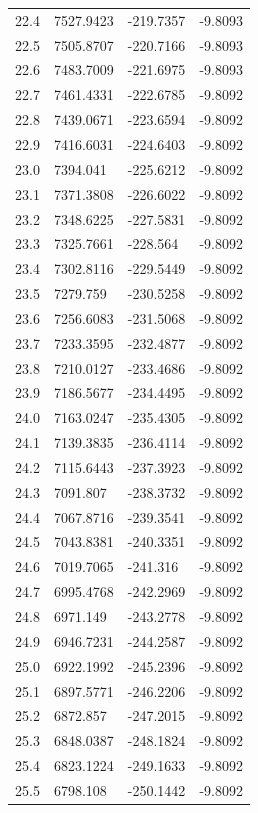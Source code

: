 \begin{table}[H]
\begin{tabular}{llll}
22.4 & 7527.9423 & -219.7357 & -9.8093 \\
22.5 & 7505.8707 & -220.7166 & -9.8093 \\
22.6 & 7483.7009 & -221.6975 & -9.8093 \\
22.7 & 7461.4331 & -222.6785 & -9.8092 \\
22.8 & 7439.0671 & -223.6594 & -9.8092 \\
22.9 & 7416.6031 & -224.6403 & -9.8092 \\
23.0 & 7394.041 & -225.6212 & -9.8092 \\
23.1 & 7371.3808 & -226.6022 & -9.8092 \\
23.2 & 7348.6225 & -227.5831 & -9.8092 \\
23.3 & 7325.7661 & -228.564 & -9.8092 \\
23.4 & 7302.8116 & -229.5449 & -9.8092 \\
23.5 & 7279.759 & -230.5258 & -9.8092 \\
23.6 & 7256.6083 & -231.5068 & -9.8092 \\
23.7 & 7233.3595 & -232.4877 & -9.8092 \\
23.8 & 7210.0127 & -233.4686 & -9.8092 \\
23.9 & 7186.5677 & -234.4495 & -9.8092 \\
24.0 & 7163.0247 & -235.4305 & -9.8092 \\
24.1 & 7139.3835 & -236.4114 & -9.8092 \\
24.2 & 7115.6443 & -237.3923 & -9.8092 \\
24.3 & 7091.807 & -238.3732 & -9.8092 \\
24.4 & 7067.8716 & -239.3541 & -9.8092 \\
24.5 & 7043.8381 & -240.3351 & -9.8092 \\
24.6 & 7019.7065 & -241.316 & -9.8092 \\
24.7 & 6995.4768 & -242.2969 & -9.8092 \\
24.8 & 6971.149 & -243.2778 & -9.8092 \\
24.9 & 6946.7231 & -244.2587 & -9.8092 \\
25.0 & 6922.1992 & -245.2396 & -9.8092 \\
25.1 & 6897.5771 & -246.2206 & -9.8092 \\
25.2 & 6872.857 & -247.2015 & -9.8092 \\
25.3 & 6848.0387 & -248.1824 & -9.8092 \\
25.4 & 6823.1224 & -249.1633 & -9.8092 \\
25.5 & 6798.108 & -250.1442 & -9.8092 \\

\end{tabular}
\end{table}
